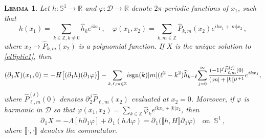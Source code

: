 \documentclass[11pt]{article}
\theoremstyle{plain}
\newtheorem{lemma}[theorem]{\scshape Lemma}
\theoremstyle{definition}
\theoremstyle{definition}
\def\bbR{{\mathbb R}}
\def\bbZ{{\mathbb Z}}
\def\D{{\mathcal D}}
\def\p{\text{\bf\emph{p}}}
\def\ft #1{{\widehat{#1}}}
\def\p{{\partial\hspace{1pt}}}
\def\comm#1#2{{\llbracket#1,#2\rrbracket}}
\def\smallexp#1{{\text{\small #1}}}
\def\footnoteexp#1{{\text{\footnotesize #1}}}
\def\ddfrac#1#2{\footnoteexp{$\displaystyle{}\frac{#1}{#2}$}}
\begin{document}
\begin{lemma}\label{lem:p1X}
Let $h:\mathbb{S}^1\to\bbR$ and $\varphi:\D\to \bbR$ denote $2\pi$-periodic functions of $x_1$, such that
$$
h(x_1) = \sum_{k\in\bbZ, k\ne 0} \ft{h}_k e^{ikx_1}\,,\quad \varphi(x_1,x_2) =
\sum_{k,m\in\bbZ} \ft{P}_{k,m}(x_2) e^{ikx_1 + |m|x_2} \,,
$$
where $x_2 \mapsto \ft{P}_{k,m}(x_2)$ is a polynomial function. If $X$ is the unique solution to \eqref{elliptic1}, then
\begin{equation}\label{p1X}
(\p_{\!1} X)(x_1,0) =  - H \big[(\p_{\!1} h)(\p_{\!1} \varphi)\big] - \smallexp{$\sum_{k,\ell,m\in \bbZ}$} i\text{\rm sgn}(k) |m| (\ell^2 - k^2) \ft{h}_{k-\ell} \smallexp{$\sum_{j=0}^\infty \ddfrac{(-1)^j \ft{P}^{(j)}_{\ell,m}(0)}{(|m|+|k|)^{j+1}}$} e^{ikx_1},
\end{equation}
where $\ft{P}^{(j)}_{\ell,m}(0)$ denotes $\p_2^j\ft{P}_{\ell,m}(x_2)$  evaluated at $x_2=0$.
Moreover,
if $\varphi$ is harmonic in $\D$ so that $\varphi(x_1,x_2) = \sum\limits_{k\in\bbZ} \ft{\varphi}_k e^{ikx_1 + |k|x_2}$, then
    \begin{equation}\label{p1X2}
    \p_{\!1} X = - \Lambda [h \p_{\!1}\varphi] + \p_{\!1} (h\Lambda \varphi) = \p_{\!1} \big(\comm{h}{H} \p_{\!1}\varphi\big)\quad\text{on }\ \mathbb{S}^1\,,
    \end{equation}
where $\comm{\cdot }{\cdot }$ denotes the commutator.
\end{lemma}
\end{document}
